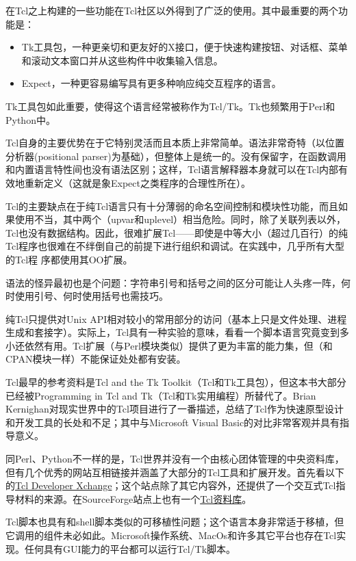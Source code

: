 \documentclass[12pt,oneside]{book}
\begin{document}
\begin{common-format}
在Tcl之上构建的一些功能在Tcl社区以外得到了广泛的使用。其中最重要的两个功能是：
\begin{itemize}
\item Tk工具包，一种更亲切和更友好的X接口，便于快速构建按钮、对话框、菜单和滚动文本窗口并从这些构件中收集输入信息。
\item Expect，一种更容易编写具有更多种响应纯交互程序的语言。
\end{itemize}

Tk工具包如此重要，使得这个语言经常被称作为Tcl/Tk。Tk也频繁用于Perl和Python中。

Tcl自身的主要优势在于它特别灵活而且本质上非常简单。语法非常奇特（以位置分析器(positional parser)为基础），但整体上是统一的。没有保留字，在函数调用和内置语言特性间也没有语法区别；这样，Tcl语言解释器本身就可以在Tcl内部有效地重新定义（这就是象Expect之类程序的合理性所在）。

Tcl的主要缺点在于纯Tcl语言只有十分薄弱的命名空间控制和模块性功能，而且如果使用不当，其中两个（upvar和uplevel）相当危险。同时，除了关联列表以外，Tcl也没有数据结构。因此，很难扩展Tcl——即使是中等大小（超过几百行）的纯Tcl程序也很难在不绊倒自己的前提下进行组织和调试。在实践中，几乎所有大型的Tcl程
序都使用其OO扩展。

语法的怪异最初也是个问题：字符串引号和括号之间的区分可能让人头疼一阵，何时使用引号、何时使用括号也需技巧。

纯Tcl只提供对Unix API相对较小的常用部分的访问（基本上只是文件处理、进程生成和套接字）。实际上，Tcl具有一种实验的意味，看看一个脚本语言究竟变到多小还依然有用。Tcl扩展（与Perl模块类似）提供了更为丰富的能力集，但（和CPAN模块一样）不能保证处处都有安装。

Tcl最早的参考资料是Tcl and the Tk Toolkit（Tcl和Tk工具包）\cite{Ousterhout94}，但这本书大部分已经被Programming in Tcl and Tk（Tcl和Tk实用编程）\cite{Welch}所替代了。Brian Kernighan对现实世界中的Tcl项目进行了一番描述\cite{Kernighan95}，总结了Tcl作为快速原型设计和开发工具的长处和不足；其中与Microsoft Visual Basic的对比非常客观并具有指导意义。

同Perl、Python不一样的是，Tcl世界并没有一个由核心团体管理的中央资料库，但有几个优秀的网站互相链接并涵盖了大部分的Tcl工具和扩展开发。首先看以下的\href{http://www.tcltk.com/}{Tcl Developer Xchange}；这个站点除了其它内容外，还提供了一个交互式Tcl指导材料的来源。在SourceForge站点上也有一个\href{http://sourceforge.net/foundry/tcl-foundry/}{Tcl资料库}。

Tcl脚本也具有和shell脚本类似的可移植性问题；这个语言本身非常适于移植，但它调用的组件未必如此。Microsoft操作系统、MacOs和许多其它平台也存在Tcl实现。任何具有GUI能力的平台都可以运行Tcl/Tk脚本。


\end{common-format}
\end{document}
